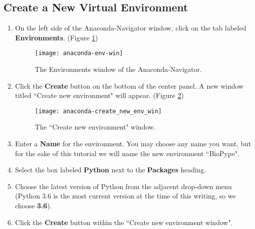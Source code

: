 \subsection{Create a New Virtual Environment}
    \begin{enumerate}
        \item On the left side of the Anaconda-Navigator window, click on the tab labeled \textbf{Environments}. (Figure \ref{anaconda-env-win}) 
        \begin{figure}
            \texttt{[image: anaconda-env-win]}
            \caption{The Environments window of the Anaconda-Navigator.}
            \label{anaconda-env-win}
        \end{figure}
        \item Click the \textbf{Create} button on the bottom of the center panel. A new window titled ``Create new environment" will appear. (Figure \ref{anaconda-create-new-env-win})
        \begin{figure}[h]
            \begin{center}
            \texttt{[image: anaconda-create\_new\_env\_win]}
            \caption{The ``Create new environment" window.}
            \label{anaconda-create-new-env-win}
            \end{center}
        \end{figure}
        \item Enter a \textbf{Name} for the environment. You may choose any name you want, but for the sake of this tutorial we will name the new environment ``BioPype".
        \item Select the box labeled \textbf{Python} next to the \textbf{Packages} heading.
        \item Choose the latest version of Python from the adjacent drop-down menu (Python 3.6 is the most current version at the time of this writing, so we choose \textbf{3.6}).
        \item Click the \textbf{Create} button within the ``Create new environment window".
    \end{enumerate}

